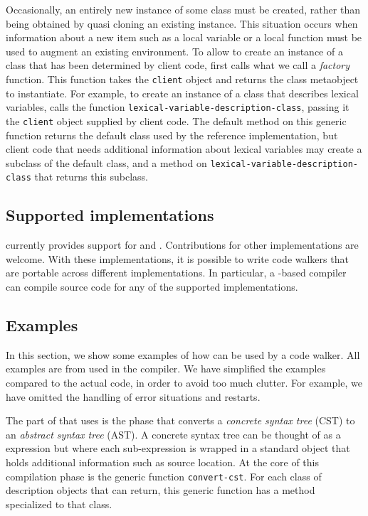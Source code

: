 Occasionally, an entirely new instance of some class must be created,
rather than being obtained by quasi cloning an existing instance.
This situation occurs when information about a new item such as a
local variable or a local function must be used to augment an existing
environment.  To allow \trucler{} to create an instance of a class
that has been determined by client code, \trucler{} first calls what
we call a \emph{factory} function.  This function takes the
\texttt{client} object and returns the class metaobject to
instantiate.  For example, to create an instance of a class that
describes lexical variables, \trucler{} calls the function
\texttt{lexical-variable-description-class}, passing it the
\texttt{client} object supplied by client code.  The default method on
this generic function returns the default class used by the reference
implementation, but client code that needs additional information
about lexical variables may create a subclass of the default class,
and a method on \texttt{lexical-variable-description-class} that
returns this subclass.

\subsection{Supported \commonlisp{} implementations}
\label{trucler-supported-implementations}

\trucler{} currently provides support for \sbcl{} and \ccl{}.
Contributions for other \commonlisp{} implementations are welcome.
With these implementations, it is possible to write code walkers that
are portable across different \commonlisp{} implementations.  In
particular, a \cleavir{}-based compiler can compile source code for
any of the supported implementations.

\subsection{Examples}

In this section, we show some examples of how \trucler{} can be used
by a code walker.  All examples are from \cleavir{} used in the
\sicl{} compiler.  We have simplified the examples compared to the
actual code, in order to avoid too much clutter.  For example, we have
omitted the handling of error situations and restarts.

The part of \cleavir{} that uses \trucler{} is the phase that converts
a \emph{concrete syntax tree} (CST) to an \emph{abstract syntax tree}
(AST).  A concrete syntax tree can be thought of as a \commonlisp{}
expression but where each sub-expression is wrapped in a standard
object that holds additional information such as source location.  At
the core of this compilation phase is the generic function
\texttt{convert-cst}.  For each class of description objects that
\trucler{} can return, this generic function has a method specialized
to that class.

